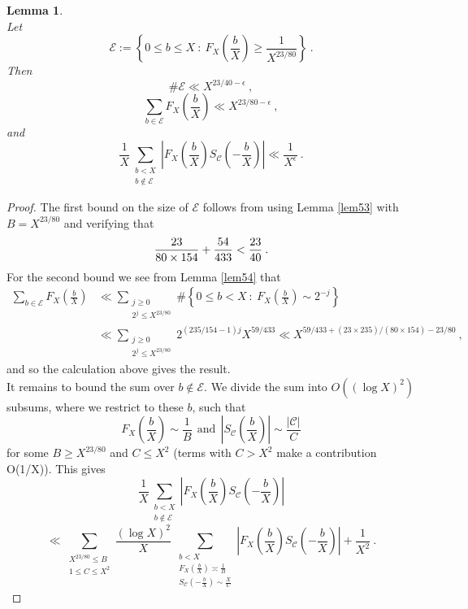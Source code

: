 \documentclass{amsart}
\newtheorem{lemma}[theorem]{Lemma}
\numberwithin{equation}{subsection}
\begin{document}
\begin{lemma}\label{(Generic frequency bounds)}$ $\\
Let 
$$\mathcal{E}:=\left\{0\leq b\leq X \::\: F_X\left(\frac{b}{X}\right)\geq \frac{1}{X^{23/80}}  \right\}\:.$$
Then 
$$\#\mathcal{E} \ll X^{23/40-\epsilon}\:,$$
$$\sum_{b\in \mathcal{E}} F_X\left(\frac{b}{X}\right) \ll X^{23/80-\epsilon}\:,$$
and
$$\frac{1}{X} \sum_{\substack{b< X \\ b\not\in \mathcal{E}}} \left| F_X\left(\frac{b}{X}\right) S_{\mathcal{C}}\left(-\frac{b}{X}\right)  \right| \ll \frac{1}{X^\epsilon} \:.$$
\end{lemma}
\begin{proof}
The first bound on the size of $\mathcal{E}$ follows from using Lemma \ref{lem53} with \mbox{$B=X^{23/80}$} and verifying that
$$\frac{23\time 235}{80\times 154}+\frac{54}{433}<\frac{23}{40}\:.$$
For the second bound we see from Lemma \ref{lem54} that
\begin{align*}
\sum_{b\in\mathcal{E}} F_X\left(\frac{b}{X}\right) &\ll \sum_{\substack{j\geq 0 \\ 2^j\leq X^{23/80}}} \# \left\{ 0\leq b <X\::\: F_X\left(\frac{b}{X}\right) \sim 2^{-j} \right\}\\
&\ll \sum_{\substack{j\geq 0 \\ 2^j\leq X^{23/80}}} 2^{(235/154-1)j} X^{59/433} 
\ll X^{59/433+(23\times 235)/(80\times 154)-23/80}\:,
\end{align*}
and so the calculation above gives the result.\\
It remains to bound the sum over $b\not\in\mathcal{E}$. We divide the sum into $O((\log X)^2)$ subsums, where we restrict to these $b$, such that
$$ F_X\left(\frac{b}{X}\right)  \sim \frac{1}{B}\ \ \text{and}\ \ 
 \left|S_{\mathcal{C}}\left(\frac{b}{X}\right)\right| \sim \frac{|\mathcal{C}|}{C}$$
 for some $B\geq X^{23/80}$ and $C\leq X^2$ (terms with $C> X^2$ make a contribution O(1/X)). This gives
 $$ \frac{1}{X} \sum_{\substack{b< X \\ b\not\in \mathcal{E}}} \left|F_X\left(\frac{b}{X}\right) S_{\mathcal{C}}\left(-\frac{b}{X}\right) \right|$$ 
 $$\ll \sum_{\substack{X^{23/80}\leq B \\ 1\leq C\leq X^2}} \frac{(\log X)^2}{X} \ \sum_{\substack{b< X \\ F_X\left(\frac{b}{X}\right)\asymp \frac{1}{B} \\  S_{\mathcal{C}}\left(-\frac{b}{X}\right)\sim \frac{X}{C} }} \left|F_X\left(\frac{b}{X}\right) S_{\mathcal{C}}\left(-\frac{b}{X}\right) \right| +\frac{1}{X^2}\:. $$

\end{proof}
\end{document}

